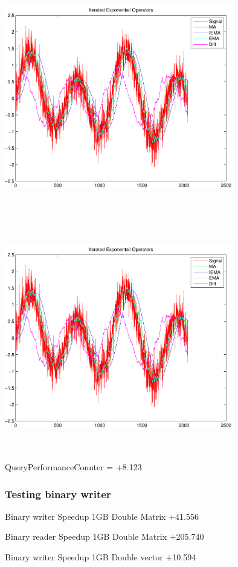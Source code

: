 \documentclass[9pt]{article}
\theoremstyle{plain}
\theoremstyle{definition}
\theoremstyle{remark}
\numberwithin{equation}{section}
\begin{document}
\includegraphics[width=10.0cm,height=10.0cm]{IteratedExponentailOperators.pdf}

\includegraphics[width=10.0cm,height=10.0cm]{IteratedExponentailOperators.pdf}

QueryPerformanceCounter  =  +8.123
\subsubsection{Testing binary writer}
Binary writer Speedup 1GB Double Matrix +41.556

Binary reader Speedup 1GB Double Matrix +205.740

Binary writer Speedup 1GB Double vector +10.594
\end{document}
